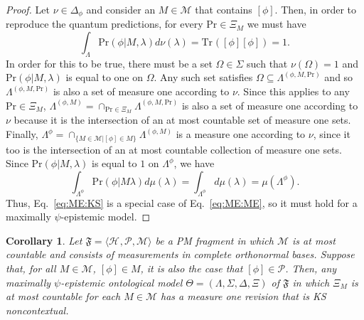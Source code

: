 \documentclass[DIV=calc,fontsize=12pt]{scrartcl} %
\theoremstyle{definition}
\theoremstyle{plain}
\newtheorem{corollary}[definition]{Corollary}
\newcommand{\Proj}[1]{\ensuremath{\left [ #1 \right ]}}
\newcommand{\Hilb}[1][]{\ensuremath{\mathcal{H}_{#1}}}
\newcommand{\Tr}[2][]{\ensuremath{\text{Tr}_{#1} \left ( #2 \right )}}
\begin{document}
\begin{proof}
Let $\nu \in \Delta_{\phi}$ and consider an $M \in \mathcal{M}$ that
contains $\Proj{\phi}$.  Then, in order to reproduce the quantum
predictions, for every $\text{Pr} \in \Xi_M$ we must have
\begin{equation}
\int_{\Lambda} \text{Pr}(\phi|M,\lambda) d\nu(\lambda) =
\Tr{\Proj{\phi}\Proj{\phi}} = 1.
\end{equation}
In order for this to be true, there must be a set $\Omega \in
\Sigma$ such that $\nu(\Omega) = 1$ and $\text{Pr}(\phi|M,\lambda)$
is equal to one on $\Omega$.  Any such set satisfies $\Omega
\subseteq \Lambda^{(\phi,M,\text{Pr})}$ and so
$\Lambda^{(\phi,M,\text{Pr})}$ is also a set of measure one
according to $\nu$.  Since this applies to any $\text{Pr} \in
\Xi_M$, $\Lambda^{(\phi,M)} = \cap_{\text{Pr} \in \Xi_M}
\Lambda^{(\phi,M,\text{Pr})}$ is also a set of measure one according
to $\nu$ because it is the intersection of an at most countable set
of measure one sets.  Finally, $\Lambda^{\phi} = \cap_{\{M \in
\mathcal{M}| \Proj{\phi} \in M\}} \Lambda^{(\phi,M)}$ is a measure
one according to $\nu$, since it too is the intersection of an at
most countable collection of measure one sets. Since
$\text{Pr}(\phi|M,\lambda)$ is equal to $1$ on $\Lambda^{\phi}$, we
have
\begin{equation}
\int_{\Lambda^{\phi}} \text{Pr}(\phi|M \lambda) d\mu(\lambda) =
\int_{\Lambda^{\phi}} d\mu(\lambda) = \mu(\Lambda^{\phi}).
\end{equation}
Thus, Eq.~\eqref{eq:ME:KS} is a special case of
Eq.~\eqref{eq:ME:ME}, so it must hold for a maximally
$\psi$-epistemic model.
\end{proof}

\begin{corollary}
\label{cor:ME:KS}
Let $\mathfrak{F} = \langle \Hilb, \mathcal{P}, \mathcal{M} \rangle$
be a PM fragment in which $\mathcal{M}$ is at most countable and
consists of measurements in complete orthonormal bases.  Suppose
that, for all $M \in \mathcal{M}$, $\Proj{\phi} \in M$, it is also
the case that $\Proj{\phi} \in \mathcal{P}$.  Then, any maximally
$\psi$-epistemic ontological model $\Theta =
(\Lambda,\Sigma,\Delta,\Xi)$ of $\mathfrak{F}$ in which $\Xi_M$ is
at most countable for each $M \in \mathcal{M}$ has a measure one
revision that is KS noncontextual.
\end{corollary}
\end{document}
